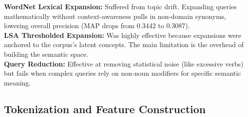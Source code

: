 \documentclass[runningheads]{llncs}
\begin{document}
\begin{table}[h]
\centering
\caption{Phase 1: Performance and Limitations of Query Processing Methods}
\label{tab:query_processing_limitations}
\end{table}

\noindent \textbf{WordNet Lexical Expansion:} Suffered from topic drift. Expanding queries mathematically without context-awareness pulls in non-domain synonyms, lowering overall precision (MAP drops from 0.3442 to 0.3087). \\
\textbf{LSA Thresholded Expansion:} Was highly effective because expansions were anchored to the corpus's latent concepts. The main limitation is the overhead of building the semantic space. \\
\textbf{Query Reduction:} Effective at removing statistical noise (like excessive verbs) but fails when complex queries rely on non-noun modifiers for specific semantic meaning.

\subsection{Tokenization and Feature Construction}
\end{document}
